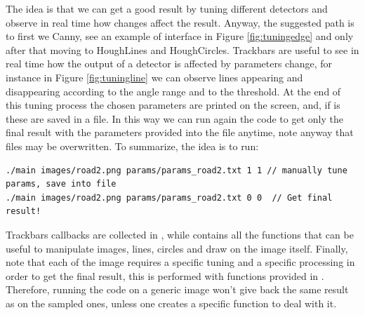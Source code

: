\documentclass[twoside,onecolumn]{article}
\theoremstyle{definition}
\begin{document}
The idea is that we can get a good result by tuning different detectors and observe in real time how changes affect the result. Anyway, the suggested path is to first we Canny, see an example of interface in Figure \ref{fig:tuningedge} and only after that moving to HoughLines and HoughCircles. Trackbars are useful to see in real time how the output of a detector is affected by parameters change, for instance in Figure \ref{fig:tuningline} we can observe lines appearing and disappearing according to the angle range and to the threshold. At the end of this tuning process the chosen parameters are printed on the screen, and, if  is  these are saved in a  file. In this way we can run again the code to get only the final result with the parameters provided into the file anytime, note anyway that files may be overwritten. To summarize, the idea is to run:
\begin{verbatim}
./main images/road2.png params/params_road2.txt 1 1 // manually tune params, save into file
./main images/road2.png params/params_road2.txt 0 0  // Get final result!
\end{verbatim}

Trackbars callbacks are collected in , while  contains all the functions that can be useful to manipulate images, lines, circles and draw on the image itself.
Finally, note that each of the image requires a specific tuning and a specific processing in order to get the final result, this is performed with functions provided in . Therefore, running the code on a generic image won't give back the same result as on the sampled ones, unless one creates a specific function to deal with it.
\end{document}
